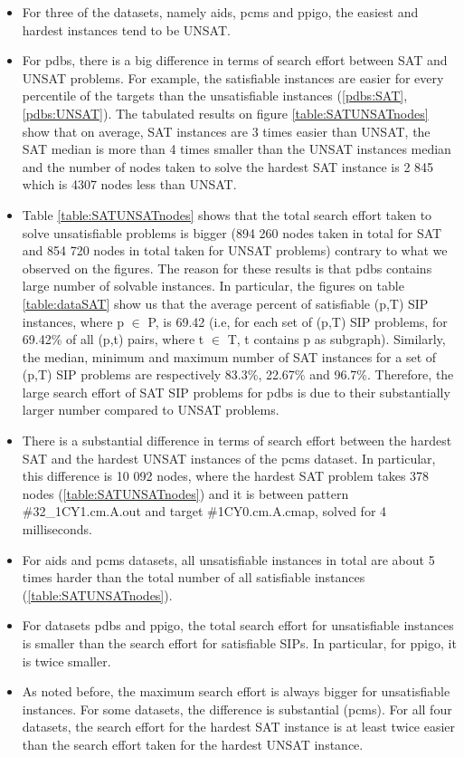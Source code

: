 \documentclass{l4proj}
\newcounter{example}[section]
\begin{document}
\begin{itemize}
\item For three of the datasets, namely aids, pcms and ppigo, the easiest and hardest instances tend to be UNSAT.
\item For pdbs, there is a big difference in terms of search effort between SAT and UNSAT problems. For example, the satisfiable instances are easier for every percentile of the targets than the unsatisfiable instances (\ref{pdbs:SAT}, \ref{pdbs:UNSAT}). The tabulated results on figure \ref{table:SATUNSATnodes} show that on average, SAT instances are 3 times easier than UNSAT, the SAT median is more than 4 times smaller than the UNSAT instances median and the number of nodes taken to solve the hardest SAT instance is 2 845 which is 4307 nodes less than UNSAT.
\item Table \ref{table:SATUNSATnodes} shows that the total search effort taken to solve unsatisfiable problems is bigger (894 260 nodes taken in total for SAT and 854 720 nodes in total taken for UNSAT problems) contrary to what we observed on the figures. The reason for these results is that pdbs contains large number of solvable instances. In particular, the figures on table \ref{table:dataSAT} show us that the average percent of satisfiable (p,T) SIP instances, where p $\in$ P, is 69.42 (i.e, for each set of (p,T) SIP problems, for 69.42\% of all (p,t) pairs, where t $\in$ T, t contains p as subgraph). Similarly, the median, minimum and maximum number of SAT instances for a set of (p,T) SIP problems are respectively 83.3\%, 22.67\% and 96.7\%. Therefore, the large search effort of SAT SIP problems for pdbs is due to their substantially larger number compared to UNSAT problems. 
\item There is a substantial difference in terms of search effort between the hardest SAT and the hardest UNSAT instances of the pcms dataset. In particular, this difference is 10 092 nodes, where the hardest SAT problem takes 378 nodes (\ref{table:SATUNSATnodes}) and it is between pattern \#32\_1CY1.cm.A.out and target \#1CY0.cm.A.cmap, solved for 4 milliseconds.
\item For aids and pcms datasets, all unsatisfiable instances in total are about 5 times harder than the total number of all satisfiable instances (\ref{table:SATUNSATnodes}).
\item For datasets pdbs and ppigo, the total search effort for unsatisfiable instances is smaller than the search effort for satisfiable SIPs. In particular, for ppigo, it is twice smaller.
\item As noted before, the maximum search effort is always bigger for unsatisfiable instances. For some datasets, the difference is substantial (pcms). For all four datasets, the search effort for the hardest SAT instance is at least twice easier than the search effort taken for the hardest UNSAT instance. 
\end{itemize}
\end{document}
